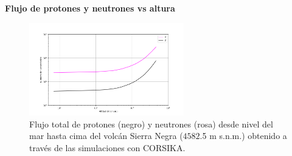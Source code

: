     \begin{frame}{} %
        \justifying %
        \vspace*{-0.2cm} %

        \begin{tcolorbox}[colback=custombgcolor8, coltext=customfgcolor2,
                      colframe=custombgcolor8, %
                      width=\textwidth,       %
                      boxrule=1pt,            %
                      top=1mm, bottom=1mm,     %
                      sharp corners=all,     %
                      halign=center,         %
                      valign=center,         %
                      ]
            \textbf{Flujo de protones y neutrones vs altura}        
        \end{tcolorbox}
        
        \begin{figure}
            \centering
            \includegraphics[width=0.6\textwidth]{Figures/Thesis_flux_protons_and_neutrons.png}
            \caption{\tiny Flujo total de protones (negro) y neutrones (rosa) desde nivel del mar hasta cima del volcán Sierra Negra ($4582$.5 m s.n.m.) obtenido a través de las simulaciones con CORSIKA.}
        \end{figure}
    \end{frame} 
    
